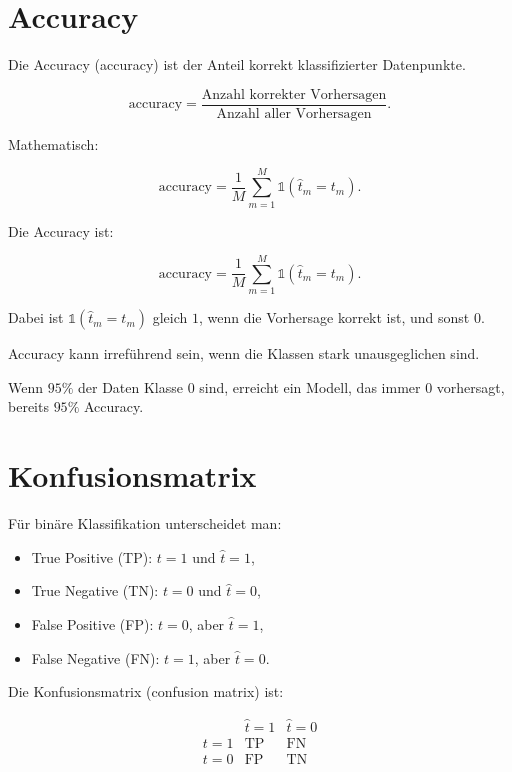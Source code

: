 \section{Accuracy}

Die Accuracy (accuracy) ist der Anteil korrekt klassifizierter Datenpunkte.

\[
    \mathrm{accuracy}
    =
    \frac{
        \text{Anzahl korrekter Vorhersagen}
    }{
        \text{Anzahl aller Vorhersagen}
    }.
\]

Mathematisch:

\[
    \mathrm{accuracy}
    =
    \frac{1}{M}
    \sum_{m=1}^{M}
    \mathbb{1}(\hat{t}_m=t_m).
\]

\begin{definitionbox}
Die Accuracy ist:

\[
    \mathrm{accuracy}
    =
    \frac{1}{M}
    \sum_{m=1}^{M}
    \mathbb{1}(\hat{t}_m=t_m).
\]

Dabei ist \(\mathbb{1}(\hat{t}_m=t_m)\) gleich \(1\), wenn die Vorhersage korrekt ist, und sonst \(0\).
\end{definitionbox}

\begin{notebox}
Accuracy kann irreführend sein, wenn die Klassen stark unausgeglichen sind.

Wenn \(95\%\) der Daten Klasse \(0\) sind, erreicht ein Modell, das immer \(0\) vorhersagt, bereits \(95\%\) Accuracy.
\end{notebox}

\section{Konfusionsmatrix}

Für binäre Klassifikation unterscheidet man:

\begin{itemize}
    \item True Positive (TP): \(t=1\) und \(\hat{t}=1\),
    \item True Negative (TN): \(t=0\) und \(\hat{t}=0\),
    \item False Positive (FP): \(t=0\), aber \(\hat{t}=1\),
    \item False Negative (FN): \(t=1\), aber \(\hat{t}=0\).
\end{itemize}

Die Konfusionsmatrix (confusion matrix) ist:

\[
\begin{array}{c|cc}
    & \hat{t}=1 & \hat{t}=0 \\
    \hline
    t=1 & \mathrm{TP} & \mathrm{FN} \\
    t=0 & \mathrm{FP} & \mathrm{TN}
\end{array}
\]

